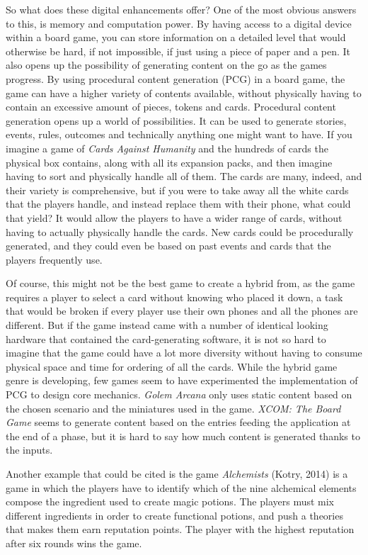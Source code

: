 So what does these digital enhancements offer? One of the most obvious answers to this, is memory and computation power. By having access to a digital device within a board game, you can store information on a detailed level that would otherwise be hard, if not impossible, if just using a piece of paper and a pen. 
It also opens up the possibility of generating content on the go as the games progress. By using procedural content generation (PCG) in a board game, the game can have a higher variety of contents available, without physically having to contain an excessive amount of pieces, tokens and cards. 
Procedural content generation opens up a world of possibilities. It can be used to generate stories, events, rules, outcomes and technically anything one might want to have. If you imagine a game of \textit{Cards Against Humanity}\cite{game:cah} and the hundreds of cards the physical box contains, along with all its expansion packs, and then imagine having to sort and physically handle all of them. The cards are many, indeed, and their variety is comprehensive, but if you were to take away all the white cards that the players handle, and instead replace them with their phone, what could that yield? It would allow the players to have a wider range of cards, without having to actually physically handle the cards. New cards could be procedurally generated, and they could even be based on past events and cards that the players frequently use. 

Of course, this might not be the best game to create a hybrid from, as the game requires a player to select a card without knowing who placed it down, a task that would be broken if every player use their own phones and all the phones are different. But if the game instead came with a number of identical looking hardware that contained the card-generating software, it is not so hard to imagine that the game could have a lot more diversity without having to consume physical space and time for ordering of all the cards.
While the hybrid game genre is developing, few games seem to have experimented the implementation of PCG to design core mechanics. 
\textit{Golem Arcana} only uses static content based on the chosen scenario and the miniatures used in the game.
\textit{XCOM: The Board Game} seems to generate content based on the entries feeding the application at the end of a phase, but it is hard to say how much content is generated thanks to the inputs. 

Another example that could be cited is the game \textit{Alchemists} (Kotry, 2014)\cite{game:alch} is a game in which the players have to identify which of the nine alchemical elements compose the ingredient used to create magic potions. The players must mix different ingredients in order to create functional potions, and push a theories that makes them earn reputation points. The player with the highest reputation after six rounds wins the game.

